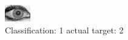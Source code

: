 \begin{figure}[h!]
\begin{center}
\includegraphics[width=0.60\columnwidth]{figures/ID2003_class_1_target_2.png}
\end{center}
\caption{ Classification: 1 actual target: 2}
\label{fig:ID2003_class_1_target_2}
\end{figure}
